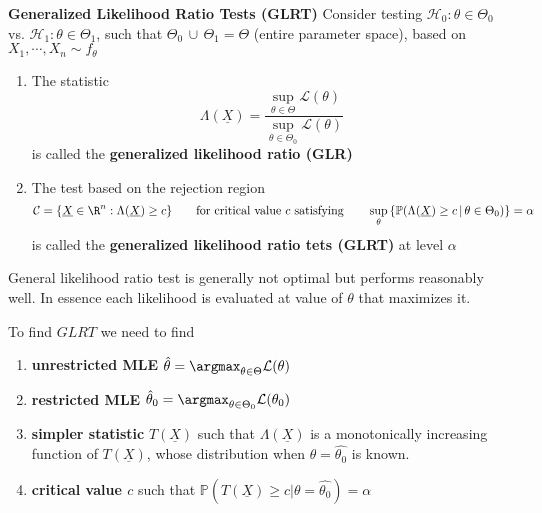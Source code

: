 \documentclass[11pt]{article}
\begin{document}
\begin{defn*}
  \textbf{Generalized Likelihood Ratio Tests (GLRT)} Consider testing $\mathcal{H}_0: \theta \in\Theta_0$ vs. $\mathcal{H}_1: \theta \in \Theta_1$, such that $\Theta_0 \,\cup\, \Theta_1  = \Theta$ (entire parameter space), based on $X_1, \cdots, X_n \sim f_{\theta}$
  \begin{enumerate}
    \item The statistic
    \[
      \Lambda(\underline{X}) = \frac{ \sup\limits_{\theta\in\Theta} \mathcal{L}(\theta)}{\sup\limits_{\theta\in\Theta_0}\mathcal{L}(\theta)}
    \]
    is called the \textbf{generalized likelihood ratio (GLR)}
    \item The test based on the rejection region
    \[
      \mathcal{C} =  \{ \underline{X}\in\R^n: \Lambda(\underline{X}) \geq c\} \quad\quad \text{for critical value $c$ satisfying} \quad\quad \sup_{\theta} \left\{ \mathbb{P}(\Lambda(\underline{X}) \geq c\,|\, \theta \in \Theta_0) \right\}= \alpha
    \]
    is called the \textbf{generalized likelihood ratio tets (GLRT)} at level $\alpha$
  \end{enumerate}
  \begin{rem}
    General likelihood ratio test is generally not optimal but performs reasonably well. In essence each likelihood is evaluated at value of $\theta$ that maximizes it.
  \end{rem}
  \begin{rem}
    To find $GLRT$ we need to find
    \begin{enumerate}
      \item \textbf{unrestricted MLE} \quad $\hat{\theta} = \argmax_{\theta \in \Theta} \mathcal{L}(\theta)$
      \item \textbf{restricted MLE} \quad $\hat{\theta}_0 = \argmax_{\theta \in \Theta_0} \mathcal{L}(\theta_0)$
      \item \textbf{simpler statistic} $T(\underline{X})$ such that $\Lambda(\underline{X})$ is a monotonically increasing function of $T(\underline{X})$, whose distribution when $\theta = \hat{\theta_0}$ is known.
      \item \textbf{critical value $c$} such that $\mathbb{P}(T(\underline{X}) \geq c | \theta = \hat{\theta_0}) = \alpha$
    \end{enumerate}

  \end{rem}
\end{defn*}
\end{document}
